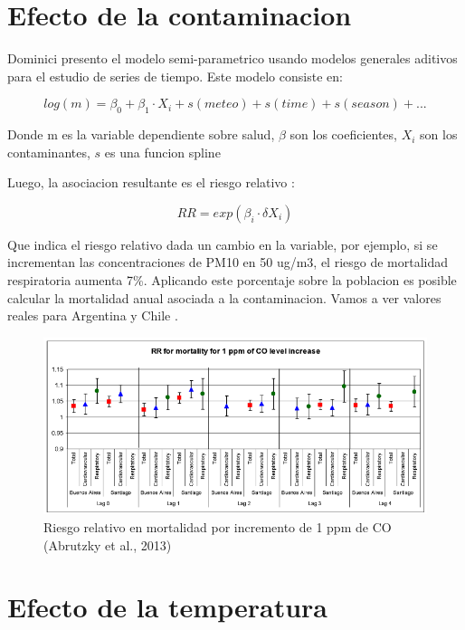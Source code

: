 \documentclass[]{book}
\begin{document}
\hypertarget{efecto-de-la-contaminacion}{%
\section{Efecto de la contaminacion}\label{efecto-de-la-contaminacion}}

Dominici presento el modelo semi-parametrico usando modelos generales aditivos \citep{gam} para el estudio de series de tiempo. Este modelo consiste en:

\begin{equation}
log(m) = \beta_0 + \beta_1 \cdot X_i + s(meteo) + s(time) + s(season) + ...
\label{eq:13}
\end{equation}

Donde m es la variable dependiente sobre salud, \(\beta\) son los coeficientes, \(X_i\) son los contaminantes, \(s\) es una funcion spline

Luego, la asociacion resultante es el riesgo relativo \citep{rosana}:

\begin{equation}
RR = exp(\beta_i \cdot \delta X_i)
\label{eq:13}
\end{equation}

Que indica el riesgo relativo dada un cambio en la variable, por ejemplo, si se incrementan las concentraciones de PM10 en 50 ug/m3, el riesgo de mortalidad respiratoria aumenta 7\%. Aplicando este porcentaje sobre la poblacion es posible calcular la mortalidad anual asociada a la contaminacion. Vamos a ver valores reales para Argentina y Chile \citep{rosana}.

\begin{figure}
\includegraphics[width=11.44in,height=1.8\textheight]{figs/rosana1} \caption{Riesgo relativo en mortalidad por incremento de 1 ppm de CO (Abrutzky et al., 2013)}\label{fig:unnamed-chunk-57}
\end{figure}

\hypertarget{efecto-de-la-temperatura}{%
\section{Efecto de la temperatura}\label{efecto-de-la-temperatura}}
\end{document}
